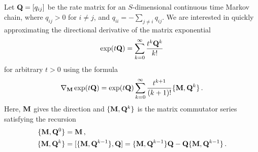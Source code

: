 \documentclass[12pt]{article} %
\begin{document}
Let $\mathbf{Q}=[q_{ij}]$ be the rate matrix for an $S$-dimensional continuous time Markov chain, where $q_{ij}>0$ for $i\neq j$, and $q_{ii} = -\sum_{j\neq i} q_{ij}$.  We are interested in quickly approximating the directional derivative of the matrix exponential
\begin{align*}
	\exp(t\mathbf{Q}) = \sum_{k=0}^\infty \frac{t^k\mathbf{Q}^k}{k!}
\end{align*}
for arbitrary $t>0$ using the formula \citep{najfeld1995derivatives}
\begin{align}\label{eq:deriv}
	\nabla_{\mathbf{M}} \exp(t\mathbf{Q})  =  \exp(t\mathbf{Q})  \sum_{k=0}^\infty \frac{t^{k+1}}{(k+1)!} \{\mathbf{M},\mathbf{Q}^k\} \, .
\end{align}
Here, $\mathbf{M}$ gives the direction and $\{\mathbf{M},\mathbf{Q}^k\}$ is the matrix commutator series satisfying the recursion
\begin{align*}
	\{\mathbf{M},\mathbf{Q}^0\} &= \mathbf{M} \, , \\ 
	\{\mathbf{M},\mathbf{Q}^k\} &= [\{\mathbf{M},\mathbf{Q}^{k-1}\} , \mathbf{Q}]  = \{\mathbf{M},\mathbf{Q}^{k-1}\} \mathbf{Q} - \mathbf{Q} \{\mathbf{M},\mathbf{Q}^{k-1}\} \, .
\end{align*}
\end{document}
